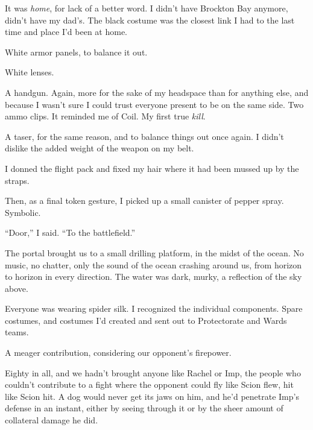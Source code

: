 It was \emph{home}, for lack of a better word.  I didn't have Brockton Bay anymore, didn't have my dad's.  The black costume was the closest link I had to the last time and place I'd been at home.



White armor panels, to balance it out.



White lenses.



A handgun.  Again, more for the sake of my headspace than for anything else, and because I wasn't sure I could trust everyone present to be on the same side.  Two ammo clips.  It reminded me of Coil.  My first true \emph{kill}.



A taser, for the same reason, and to balance things out once again.  I didn't dislike the added weight of the weapon on my belt.



I donned the flight pack and fixed my hair where it had been mussed up by the straps.



Then, as a final token gesture, I picked up a small canister of pepper spray.  Symbolic.



``Door,'' I said.  ``To the battlefield.''



\sectionbreak



The portal brought us to a small drilling platform, in the midst of the ocean.  No music, no chatter, only the sound of the ocean crashing around us, from horizon to horizon in every direction.  The water was dark, murky, a reflection of the sky above.



Everyone was wearing spider silk.  I recognized the individual components.  Spare costumes, and costumes I'd created and sent out to Protectorate and Wards teams.



A meager contribution, considering our opponent's firepower.



Eighty in all, and we hadn't brought anyone like Rachel or Imp, the people who couldn't contribute to a fight where the opponent could fly like Scion flew, hit like Scion hit.  A dog would never get its jaws on him, and he'd penetrate Imp's defense in an instant, either by seeing through it or by the sheer amount of collateral damage he did.




